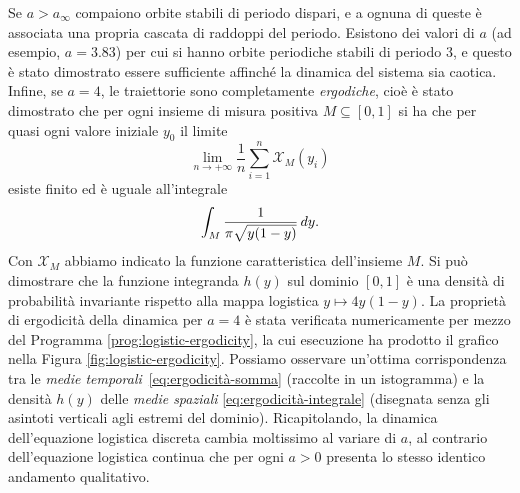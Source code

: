 Se $a > a_\infty$ compaiono orbite stabili di periodo dispari, e a ognuna
di queste è associata una propria cascata di raddoppi del periodo.
Esistono dei valori di $a$ (ad esempio, $a = 3.83$) per cui si hanno
orbite periodiche stabili di periodo 3, e questo è stato dimostrato essere sufficiente
affinché la dinamica del sistema sia caotica. Infine, se $a = 4$, le traiettorie
sono completamente \emph{ergodiche}, cioè è stato dimostrato che per ogni insieme
di misura positiva $M \subseteq [0,1]$ si ha che per quasi ogni valore iniziale
$y_0$ il limite
\begin{equation} \label{eq:ergodicità-somma}
\lim_{n \to +\infty} \frac{1}{n} \sum_{i=1}^n \mathcal{X}_M(y_i)
\end{equation}
esiste finito ed è uguale all'integrale
\begin{equation} \label{eq:ergodicità-integrale}
\int_M \frac{1}{\pi \sqrt{y(1-y)}} \, dy.
\end{equation}
Con $\mathcal{X}_M$ abbiamo indicato la funzione caratteristica dell'insieme $M$.
Si può dimostrare che la funzione integranda $h(y)$ sul dominio $[0,1]$
è una densità di probabilità invariante rispetto alla mappa logistica $y \mapsto 4y(1-y)$.
La proprietà di ergodicità della dinamica per $a=4$ è stata verificata
numericamente per mezzo del Programma \ref{prog:logistic-ergodicity},
la cui esecuzione ha prodotto il grafico nella Figura \ref{fig:logistic-ergodicity}.
Possiamo osservare un'ottima corrispondenza tra le
\emph{medie temporali}~\eqref{eq:ergodicità-somma} (raccolte in un istogramma)
e la densità $h(y)$ delle \emph{medie spaziali} \eqref{eq:ergodicità-integrale}
(disegnata senza gli asintoti verticali agli estremi del dominio).
Ricapitolando, la dinamica dell'equazione logistica discreta cambia moltissimo
al variare di $a$, al contrario dell'equazione logistica continua che per ogni
$a > 0$ presenta lo stesso identico andamento qualitativo.



